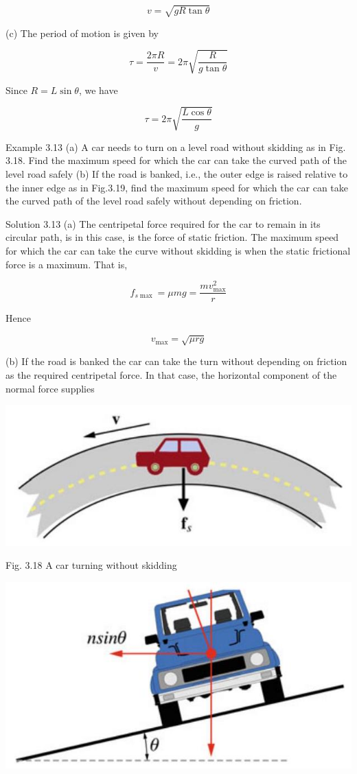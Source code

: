 \documentclass[10pt]{article}
\begin{document}
$$
v=\sqrt{g R \tan \theta}
$$

(c) The period of motion is given by

$$
\tau=\frac{2 \pi R}{v}=2 \pi \sqrt{\frac{R}{g \tan \theta}}
$$

Since $R=L \sin \theta$, we have

$$
\tau=2 \pi \sqrt{\frac{L \cos \theta}{g}}
$$

Example 3.13 (a) A car needs to turn on a level road without skidding as in Fig. 3.18. Find the maximum speed for which the car can take the curved path of the level road safely (b) If the road is banked, i.e., the outer edge is raised relative to the inner edge as in Fig.3.19, find the maximum speed for which the car can take the curved path of the level road safely without depending on friction.

Solution 3.13 (a) The centripetal force required for the car to remain in its circular path, is in this case, is the force of static friction. The maximum speed for which the car can take the curve without skidding is when the static frictional force is a maximum. That is,

$$
f_{s \max }=\mu m g=\frac{m v_{\max }^{2}}{r}
$$

Hence

$$
v_{\max }=\sqrt{\mu r g}
$$

(b) If the road is banked the car can take the turn without depending on friction as the required centripetal force. In that case, the horizontal component of the normal force supplies

\begin{center}
\includegraphics[max width=\textwidth]{2024_09_13_db1f357d2aad0a03eb2eg-058(1)}
\end{center}

Fig. 3.18 A car turning without skidding

\begin{center}
\includegraphics[max width=\textwidth]{2024_09_13_db1f357d2aad0a03eb2eg-058}
\end{center}
\end{document}
